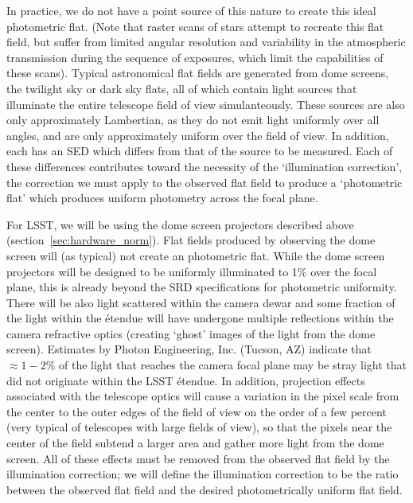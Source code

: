 \documentclass[12pt,preprint]{aastex}
\begin{document}
In practice, we do not have a point source of this nature to create
this ideal photometric flat.  (Note that raster scans of stars attempt
to recreate this flat field, but suffer from limited angular
resolution and variability in the atmospheric transmission during the
sequence of exposures, which limit the capabilities of these
scans). Typical astronomical flat fields are generated from dome
screens, the twilight sky or dark sky flats, all of which contain
light sources that illuminate the entire telescope field of view
simulanteously. These sources are also only approximately Lambertian,
as they do not emit light uniformly over all angles, and are only
approximately uniform over the field of view. In addition, each has an
SED which differs from that of the source to be measured. Each of
these differences contributes toward the necessity of the
`illumination correction', the correction we must apply to the
observed flat field to produce a `photometric flat' which produces
uniform photometry across the focal plane.

For LSST, we will be using the dome screen projectors described above
(section~\ref{sec:hardware_norm}). Flat fields produced by observing
the dome screen will (as typical) not create an photometric
flat. While the dome screen projectors will be designed to be
uniformly illuminated to 1\% over the focal plane, this is already
beyond the SRD specifications for photometric uniformity.  There will
be also light scattered within the camera dewar and some fraction of
the light within the \'{e}tendue will have undergone multiple reflections
within the camera refractive optics (creating `ghost' images of the
light from the dome screen). Estimates by Photon Engineering,
Inc. (Tucson, AZ) indicate that $\approx1-2\%$ of the light that
reaches the camera focal plane may be stray light that did not
originate within the LSST \'{e}tendue. In addition, projection effects
associated with the telescope optics will cause a variation in the
pixel scale from the center to the outer edges of the field of view on
the order of a few percent
(very typical of telescopes with large fields of view), so that the
pixels near the center of the field subtend a larger area and 
gather more light from the dome screen. All of these effects must be
removed from the observed flat field by the illumination correction;
we will define the illumination correction to be the ratio between the
observed flat field and the desired photometrically uniform flat
field. 

\label{sec:ghosting}
\end{document}
